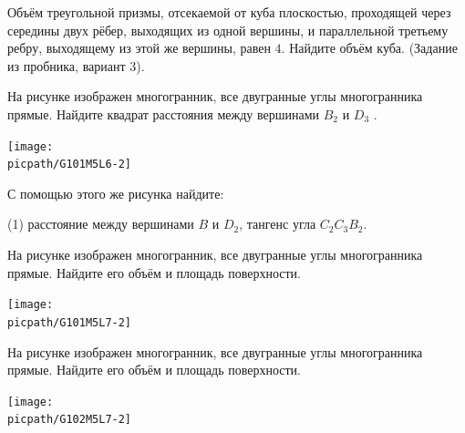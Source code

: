 \begin{class}[number=2]
	\begin{listofex}
		\item Объём треугольной призмы, отсекаемой от куба плоскостью, проходящей через середины двух рёбер, выходящих из одной вершины, и параллельной третьему ребру, выходящему из	этой же вершины, равен \( 4 \). Найдите объём куба. (Задание из пробника, вариант \( 3 \)).
		\item 
		\begin{minipage}[t]{\bodywidth}
			На рисунке изображен многогранник, все двугранные углы многогранника прямые. Найдите квадрат расстояния между вершинами \(B_2\) и \(D_3\) .
		\end{minipage}
		\hspace{0.02\linewidth}
		\begin{minipage}[t]{\picwidth}
			\texttt{[image: \\picpath/G101M5L6-2]}
		\end{minipage}
		\item С помощью этого же рисунка найдите:
		\begin{tasks}(1)
			\task расстояние между вершинами \(B\) и \(D_2\),
			\task тангенс угла \(C_2C_3B_2\).
		\end{tasks}
		\item 
		\begin{minipage}[t]{\bodywidth}
			На рисунке изображен многогранник, все двугранные углы многогранника прямые. Найдите его объём и площадь поверхности.
		\end{minipage}
		\hspace{0.02\linewidth}
		\begin{minipage}[t]{\picwidth}
			\texttt{[image: \\picpath/G101M5L7-2]}
		\end{minipage}
		\item 
		\begin{minipage}[t]{\bodywidth}
			На рисунке изображен многогранник, все двугранные углы многогранника прямые. Найдите его объём и площадь поверхности.
		\end{minipage}
		\hspace{0.02\linewidth}
		\begin{minipage}[t]{\picwidth}
			\texttt{[image: \\picpath/G102M5L7-2]}
		\end{minipage}
		\item 
		\begin{minipage}[t]{\bodywidth}

\end{minipage}
\end{listofex}
\end{class}
